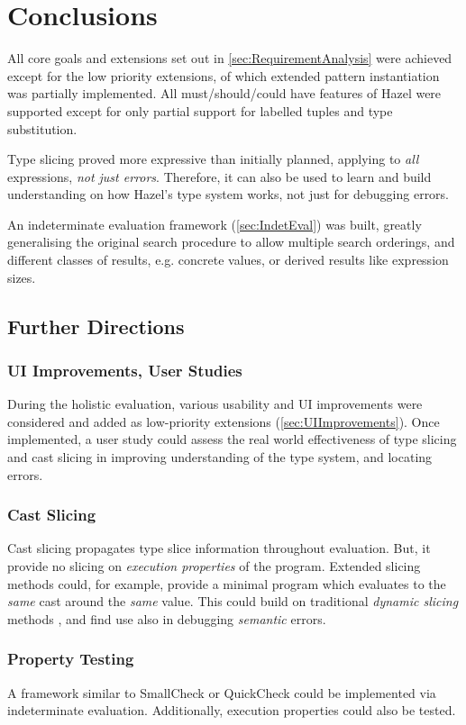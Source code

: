 \chapter{Conclusions}\label{chap:Conclusions}
All core goals and extensions set out in \cref{sec:RequirementAnalysis} were achieved except for the low priority extensions, of which extended pattern instantiation was partially implemented. All must/should/could have features of Hazel were supported except for only partial support for labelled tuples and type substitution.

Type slicing proved more expressive than initially planned, applying to \textit{all} expressions, \textit{not just errors}. Therefore, it can also be used to learn and build understanding on how Hazel's type system works, not just for debugging errors. 

An indeterminate evaluation framework (\cref{sec:IndetEval}) was built, greatly generalising the original search procedure \cite{SearchProc} to allow multiple search orderings, and different classes of results, e.g. concrete values, or derived results like expression sizes.
\section{Further Directions}
\subsection{UI Improvements, User Studies}
During the holistic evaluation, various usability and UI improvements were considered and added as low-priority extensions (\cref{sec:UIImprovements}). Once implemented, a user study could assess the real world effectiveness of type slicing and cast slicing in improving understanding of the type system, and locating errors.

\subsection{Cast Slicing}
Cast slicing propagates type slice information throughout evaluation. But, it provide no slicing on \textit{execution properties} of the program. Extended slicing methods could, for example, provide a minimal program which evaluates to the \textit{same} cast around the \textit{same} value. This could build on traditional \textit{dynamic slicing} methods \cite{DynProgSlice, FunctionalProgExplain}, and find use also in debugging \textit{semantic} errors.

\subsection{Property Testing}
A framework similar to SmallCheck \cite{SmallCheck} or QuickCheck \cite{QuickCheck} could be implemented via indeterminate evaluation. Additionally, execution properties could also be tested.

